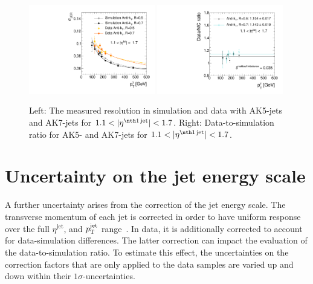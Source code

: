 \begin{figure}[!b]
  \centering
      \includegraphics[width=0.49\textwidth]{figures/resolution/systematicUncertainties/Resolution_for_3_eta_bin_MCUncertainty_RMS99.pdf}
      \includegraphics[width=0.49\textwidth]{figures/resolution/systematicUncertainties/Ratio_Resolution_for_3_eta_bin_PFCHS_RMS99_ak5_ak7_comparison.pdf}
  \caption{Left: The measured resolution in simulation and data with AK5-jets and AK7-jets for $1.1<|\etafirstjet|<1.7$. Right: Data-to-simulation ratio for AK5- and AK7-jets for $1.1<|\etafirstjet|<1.7$.}  
  \label{res:fig:MCuncertainty}
\end{figure}

\section*{Uncertainty on the jet energy scale}
A further uncertainty arises from the correction of the jet energy scale.
The transverse momentum of each jet is corrected in order to have uniform response over the full $\eta^{\text{jet}}$, and $p_{\text{T}}^{\text{jet}}$ range~\cite{bib:CMS:JERCPaper_2011}.
In data, it is additionally corrected to account for data-simulation differences.
The latter correction can impact the evaluation of the data-to-simulation ratio.
To estimate this effect, the uncertainties on the correction factors that are only applied to the data samples are varied up and down within their $1\sigma$-uncertainties.


